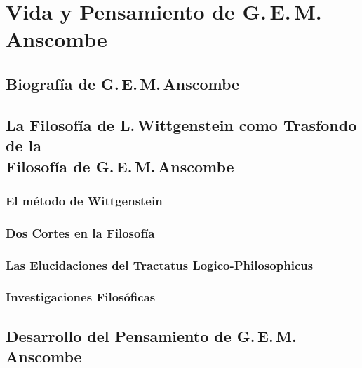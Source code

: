 \documentclass[../main.tex]{subfiles}
\begin{document}
\setcounter{chapter}{1}




%

%

%

%

\chapter{Vida y Pensamiento de G.\,E.\,M.\,Anscombe}
\section{Biografía de G.\,E.\,M.\,Anscombe}

\section{La Filosofía de L.\,Wittgenstein como Trasfondo de la\\Filosofía de
    G.\,E.\,M.\,Anscombe}
 
\subsection{El método de Wittgenstein}
\subsection{Dos Cortes en la Filosofía}
\subsection{Las Elucidaciones del Tractatus Logico-Philosophicus}
\subsection{Investigaciones Filosóficas}
\section{Desarrollo del Pensamiento de G.\,E.\,M.\,Anscombe}

\end{document}
